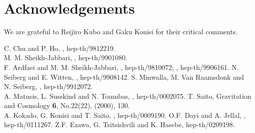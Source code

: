 \documentclass[a4paper,seceq]{ptptex}
\begin{document}
\section*{Acknowledgements}
We are grateful to Reijiro Kubo and Gaku Konisi
for their critical comments.
%
%
\begin{thebibliography}{99}
   C. Chu and P. Ho, , hep-th/9812219.\\
   M. M. Sheikh-Jabbari, , hep-th/9901080.\\
   F. Ardfaei and M. M. Sheikh-Jabbari, ,
             hep-th/9810072; , hep-th/9906161.
   N. Seiberg and E. Witten, , hep-th/9908142.
   S. Minwalla, M. Van Raamsdonk and N. Seiberg, ,
             hep-th/9912072.\\
   A. Matusis, L. Susskind and N. Toumbas, ,
             hep-th/0002075.
  T. Saito, Gravitation and Cosmology {\bf 6}, No.22(22), (2000), 130.
\\
   A. Kokado, G. Konisi and T. Saito, , 
             hep-th/0009190.
   O.F. Dayi and A. Jellal, , hep-th/0111267.
  Z.F. Ezawa, G. Tsitsishvili and K. Hasebe,
             hep-th/0209198.
\end{thebibliography}
\end{document}

